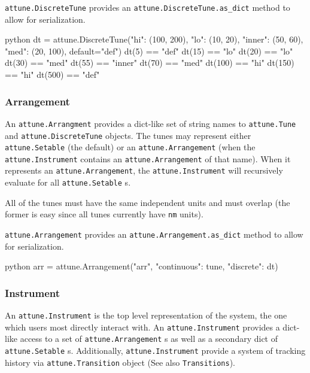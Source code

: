 \texttt{attune.DiscreteTune} provides an
\texttt{attune.DiscreteTune.as\_dict} method to allow
for serialization.

\begin{codefragment}{python}
dt = attune.DiscreteTune({"hi": (100, 200), "lo": (10, 20), "inner": (50, 60), "med": (20, 100)}, default="def")
dt(5) == "def"
dt(15) == "lo"
dt(20) == "lo"
dt(30) == "med"
dt(55) == "inner"
dt(70) == "med"
dt(100) == "hi"
dt(150) == "hi"
dt(500) == "def"
\end{codefragment}

\hypertarget{arrangement}{%
\subsubsection{Arrangement}\label{arrangement}}

An \texttt{attune.Arrangment} provides a dict-like set
of string names to \texttt{attune.Tune} and
\texttt{attune.DiscreteTune} objects. The tunes may
represent either \texttt{attune.Setable} (the default)
or an \texttt{attune.Arrangement} (when the
\texttt{attune.Instrument} contains an
\texttt{attune.Arrangement} of that name). When it
represents an \texttt{attune.Arrangement}, the
\texttt{attune.Instrument} will recursively evaluate
for all \texttt{attune.Setable} s.

All of the tunes must have the same independent units and must overlap
(the former is easy since all tunes currently have \texttt{nm} units).

\texttt{attune.Arrangement} provides an
\texttt{attune.Arrangement.as\_dict} method to allow
for serialization.

\begin{codefragment}{python}
arr = attune.Arrangement("arr", {"continuous": tune, "discrete": dt})
\end{codefragment}

\hypertarget{instrument}{%
\subsubsection{Instrument}\label{instrument}}

An \texttt{attune.Instrument} is the top level
representation of the system, the one which users most directly interact
with. An \texttt{attune.Instrument} provides a
dict-like access to a set of
\texttt{attune.Arrangement} s as well as a secondary
dict of \texttt{attune.Setable} s. Additionally,
\texttt{attune.Instrument} provide a system of tracking
history via \texttt{attune.Transition} object (See also
\texttt{Transitions}).

